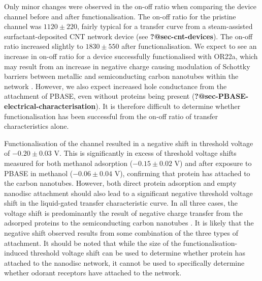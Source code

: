 \documentclass[
  a4paper,
]{scrbook}
\begin{document}
Only minor changes were observed in the on-off ratio when comparing the
device channel before and after functionalisation. The on-off ratio for
the pristine channel was \(1120\pm220\), fairly typical for a transfer
curve from a steam-assisted surfactant-deposited CNT network device (see
\textbf{?@sec-cnt-devices}). The on-off ratio increased slightly to
\(1830\pm550\) after functionalisation. We expect to see an increase in
on-off ratio for a device successfully functionalised with OR22a, which
may result from an increase in negative charge causing modulation of
Schottky barriers between metallic and semiconducting carbon nanotubes
within the network \autocite{Murugathas2019b}. However, we also expect
increased hole conductance from the attachment of PBASE, even without
proteins being present
(\textbf{?@sec-PBASE-electrical-characterisation}). It is therefore
difficult to determine whether functionalisation has been successful
from the on-off ratio of transfer characteristics alone.

Functionalisation of the channel resulted in a negative shift in
threshold voltage of \(-0.20\pm0.03\) V. This is significantly in excess
of threshold voltage shifts measured for both methanol adsorption
(\(-0.15\pm0.02\) V) and after exposure to PBASE in methanol
(\(-0.06\pm0.04\) V), confirming that protein has attached to the carbon
nanotubes. However, both direct protein adsorption
\autocite{Bradley2004,Heller2008} and empty nanodisc attachment
\autocite{Murugathas2019b} should also lead to a significant negative
threshold voltage shift in the liquid-gated transfer characteristic
curve. In all three cases, the voltage shift is predominantly the result
of negative charge transfer from the adsorped proteins to the
semiconducting carbon nanotubes
\autocite{Bradley2004,Heller2008,Murugathas2019b}. It is likely that the
negative shift observed results from some combination of the three types
of attachment. It should be noted that while the size of the
functionalisation-induced threshold voltage shift can be used to
determine whether protein has attached to the nanodisc network, it
cannot be used to specifically determine whether odorant receptors have
attached to the network.
\end{document}
